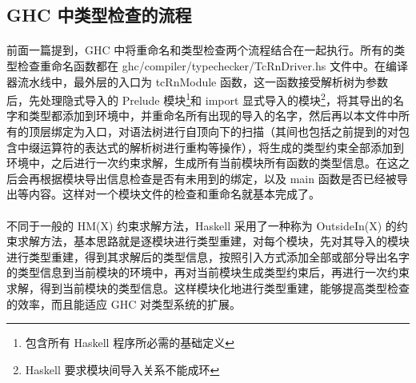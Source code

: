 \documentclass{article}
\begin{document}
	\subsection{GHC 中类型检查的流程}
	\paragraph{}
	前面一篇提到，GHC 中将重命名和类型检查两个流程结合在一起执行。所有的类型检查重命名函数都在 ghc/compiler/typechecker/TcRnDriver.hs 文件中。在编译器流水线中，最外层的入口为 tcRnModule 函数，这一函数接受解析树为参数后，先处理隐式导入的 Prelude 模块\footnote{包含所有 Haskell 程序所必需的基础定义}和 import 显式导入的模块\footnote{Haskell 要求模块间导入关系不能成环}，将其导出的名字和类型都添加到环境中，并重命名所有出现的导入的名字，然后再以本文件中所有的顶层绑定为入口，对语法树进行自顶向下的扫描（其间也包括之前提到的对包含中缀运算符的表达式的解析树进行重构等操作），将生成的类型约束全部添加到环境中，之后进行一次约束求解，生成所有当前模块所有函数的类型信息。在这之后会再根据模块导出信息检查是否有未用到的绑定，以及 main 函数是否已经被导出等内容。这样对一个模块文件的检查和重命名就基本完成了。
	\paragraph{}
	不同于一般的 HM(X) 约束求解方法，Haskell 采用了一种称为 OutsideIn(X) 的约束求解方法\cite{outsideinx-modular-type-inference-with-local-assumptions}，基本思路就是逐模块进行类型重建，对每个模块，先对其导入的模块进行类型重建，得到其求解后的类型信息，按照引入方式添加全部或部分导出名字的类型信息到当前模块的环境中，再对当前模块生成类型约束后，再进行一次约束求解，得到当前模块的类型信息。这样模块化地进行类型重建，能够提高类型检查的效率，而且能适应 GHC 对类型系统的扩展。
	\medskip
	
	
\end{document}
